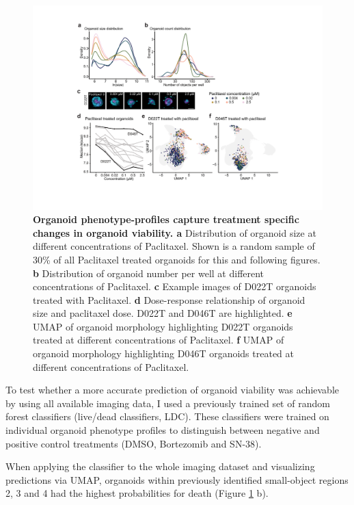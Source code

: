 \begin{flushleft}
\begin{figure}[H]
\centering
\includegraphics[width=\textwidth,
                height=\textheight,
                keepaspectratio]{figures/promise/pdf/fig_2_2.pdf}
\caption{\textbf{Organoid phenotype-profiles capture treatment specific changes in organoid viability. a} Distribution of organoid size at different concentrations of Paclitaxel. Shown is a random sample of 30\% of all Paclitaxel treated organoids for this and following figures. \textbf{b} Distribution of organoid number per well at different concentrations of Paclitaxel. \textbf{c} Example images of D022T organoids treated with Paclitaxel. \textbf{d} Dose-response relationship of organoid size and paclitaxel dose. D022T and D046T are highlighted. \textbf{e} UMAP of organoid morphology highlighting D022T organoids treated at different concentrations of Paclitaxel. \textbf{f} UMAP of organoid morphology highlighting D046T organoids treated at different concentrations of Paclitaxel.}
\label{fig_222}
\end{figure}
\bigbreak

To test whether a more accurate prediction of organoid viability was achievable by using all available imaging data, I used a previously trained set of random forest classifiers (live/dead classifiers, LDC). These classifiers were trained on individual organoid phenotype profiles to distinguish between negative and positive control treatments (DMSO, Bortezomib and SN-38). 

\bigbreak
When applying the classifier to the whole imaging dataset and visualizing predictions via UMAP, organoids within previously identified small-object regions 2, 3 and 4 had the highest probabilities for death (Figure \ref{fig_222} b). 


\end{flushleft}

